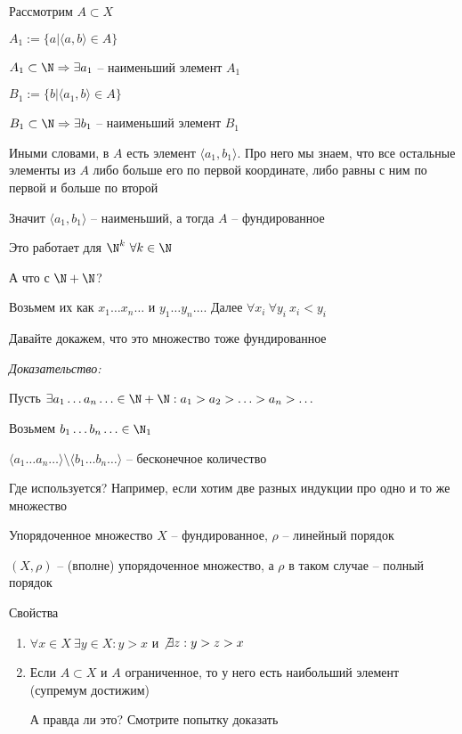 \documentclass[12pt]{article}
\newcommand{\q}[1]{\langle #1 \rangle}
\begin{document}
Рассмотрим $A \subset X$

$A_1 := \{ a | \q{a, b} \in A \}$

$A_1 \subset \N \Rightarrow \exists a_1$ -- наименьший элемент $A_1$

$B_1 := \{b | \q{a_1, b} \in A\}$

$B_1 \subset \N \Rightarrow \exists b_1$ -- наименьший элемент $B_1$

Иными словами, в $A$ есть элемент $\q{a_1, b_1}$. Про него мы знаем, что все остальные элементы из $A$ либо больше его по первой координате, либо равны с ним по первой и больше по второй

Значит $\q{a_1, b_1}$ -- наименьший, а тогда $A$ -- фундированное

\begin{Remark}{}
    Это работает для $\N^k\ \forall k \in \N$
\end{Remark}

\begin{theo}{}
    А что с $\N + \N$?

    Возьмем их как $x_1 \ldots x_n \ldots$ и $y_1 \ldots y_n \ldots$. Далее $\forall x_i\ \forall y_i\ x_i < y_i$

    Давайте докажем, что это множество тоже фундированное
\end{theo}

\textit{Доказательство:}

Пусть $\exists a_1 \ldots a_n \ldots \in \N + \N : a_1 > a_2 > \ldots > a_n > \ldots$

Возьмем $b_1 \ldots b_n \ldots \in \N_1$

$\q{a_1 \ldots a_n \ldots} \setminus \q{b_1 \ldots b_n \ldots}$ -- бесконечное количество 

\begin{Example}{Где используется?}
    Например, если хотим две разных индукции про одно и то же множество
\end{Example}

\begin{defin}{Упорядоченное множество}
    $X$ -- фундированное, $\rho$ -- линейный порядок

    $(X, \rho)$ -- (вполне) упорядоченное множество, а $\rho$ в таком случае -- полный порядок
\end{defin}

\begin{theo}{Свойства}
    \begin{enumerate}
        \item $\forall x \in X\ \exists y \in X : y > x$ и $\not\exists z : y > z > x$
        \item Если $A \subset X$ и $A$ ограниченное, то у него есть наибольший элемент (супремум достижим)
        
        А правда ли это? Смотрите попытку доказать
    \end{enumerate}
\end{theo}
\end{document}
